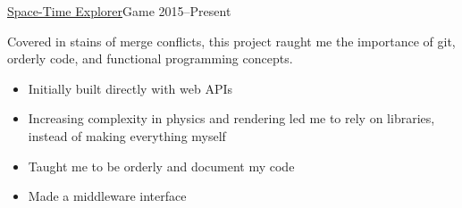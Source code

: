 \documentclass[10pt,a4paper,ragged2e,withhyper]{altacv}
\begin{document}
\begin{paracol}{2}
		\cvevent
		{\href{https://github.com/jaacko-torus/STE}{\uline{Space-Time Explorer}}{\hr}Game}
		{{\CVTagTypeScript}{\CVTagSnowpack}{\CVTagPFiveJS}{\CVTagMatterJS}{\CVTagdatGUI}}
		{2015--Present}{}
		\vspace{-0.3cm}
		\begin{justify}
			Covered in stains of merge conflicts, this project raught me the importance of git, orderly code, and functional programming concepts.
		\end{justify}
		\vspace{-0.2cm}
		\smallskip
		\begin{itemize}
			\item Initially built directly with web APIs
			\item Increasing complexity in physics and rendering led me to rely on libraries, instead of making everything myself
			\item Taught me to be orderly and document my code
			\item Made a middleware interface
		\end{itemize}
		
	\end{paracol}
\end{document}
